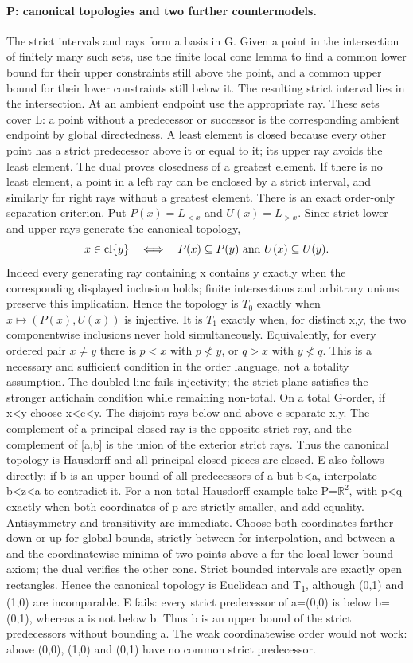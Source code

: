 \paragraph{P: canonical topologies and two further countermodels.}\label{lem:topology}
The strict intervals and rays form a basis in G. Given a point in the intersection of finitely many such sets, use the finite local cone lemma to find a common lower bound for their upper constraints still above the point, and a common upper bound for their lower constraints still below it. The resulting strict interval lies in the intersection. At an ambient endpoint use the appropriate ray. These sets cover L: a point without a predecessor or successor is the corresponding ambient endpoint by global directedness. A least element is closed because every other point has a strict predecessor above it or equal to it; its upper ray avoids the least element. The dual proves closedness of a greatest element. If there is no least element, a point in a left ray can be enclosed by a strict interval, and similarly for right rays without a greatest element.
There is an exact order-only separation criterion. Put $P(x)=L_{<x}$ and $U(x)=L_{>x}$. Since strict lower and upper rays generate the canonical topology,
\[
 x\in\operatorname{cl}\{y\}\quad\Longleftrightarrow\quad
 P(x)\subseteq P(y)\ \hbox{and}\ U(x)\subseteq U(y).
\]
Indeed every generating ray containing x contains y exactly when the corresponding displayed inclusion holds; finite intersections and arbitrary unions preserve this implication. Hence the topology is $T_0$ exactly when $x\mapsto(P(x),U(x))$ is injective. It is $T_1$ exactly when, for distinct x,y, the two componentwise inclusions never hold simultaneously. Equivalently, for every ordered pair $x\ne y$ there is $p<x$ with $p\not<y$, or $q>x$ with $y\not<q$. This is a necessary and sufficient condition in the order language, not a totality assumption. The doubled line fails injectivity; the strict plane satisfies the stronger antichain condition while remaining non-total.
On a total G-order, if x<y choose x<c<y. The disjoint rays below and above c separate x,y. The complement of a principal closed ray is the opposite strict ray, and the complement of [a,b] is the union of the exterior strict rays. Thus the canonical topology is Hausdorff and all principal closed pieces are closed. E also follows directly: if b is an upper bound of all predecessors of a but b<a, interpolate b<z<a to contradict it.
For a non-total Hausdorff example take P=$\mathbb R^2$, with p<q exactly when both coordinates of p are strictly smaller, and add equality. Antisymmetry and transitivity are immediate. Choose both coordinates farther down or up for global bounds, strictly between for interpolation, and between a and the coordinatewise minima of two points above a for the local lower-bound axiom; the dual verifies the other cone. Strict bounded intervals are exactly open rectangles. Hence the canonical topology is Euclidean and T\textsubscript{1}, although (0,1) and (1,0) are incomparable. E fails: every strict predecessor of a=(0,0) is below b=(0,1), whereas a is not below b. Thus b is an upper bound of the strict predecessors without bounding a. The weak coordinatewise order would not work: above (0,0), (1,0) and (0,1) have no common strict predecessor.
